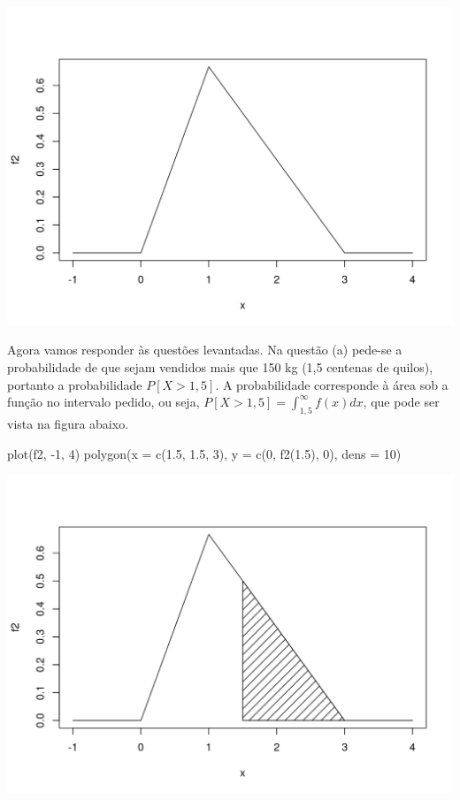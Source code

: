 \documentclass[
  10pt,
  a4paper]{book}
\newenvironment{Shaded}{\begin{snugshade}}{\end{snugshade}}
\newcommand{\AttributeTok}[1]{\textcolor[rgb]{0.77,0.63,0.00}{#1}}
\newcommand{\DecValTok}[1]{\textcolor[rgb]{0.00,0.00,0.81}{#1}}
\newcommand{\FloatTok}[1]{\textcolor[rgb]{0.00,0.00,0.81}{#1}}
\newcommand{\FunctionTok}[1]{\textcolor[rgb]{0.00,0.00,0.00}{#1}}
\newcommand{\NormalTok}[1]{#1}
\newcommand{\SpecialCharTok}[1]{\textcolor[rgb]{0.00,0.00,0.00}{#1}}
\begin{document}
\begin{center}\includegraphics{figures/unnamed-chunk-334-1} \end{center}

Agora vamos responder às questões levantadas. Na questão (a) pede-se a
probabilidade de que sejam vendidos mais que 150 kg (1,5 centenas de
quilos), portanto a probabilidade \(P[X > 1,5]\). A probabilidade
corresponde à área sob a função no intervalo pedido, ou seja,
\(P[X > 1,5] = \int_{1,5}^\infty f(x) dx\), que pode ser vista na figura
abaixo.

\begin{Shaded}
\begin{Highlighting}[]
\FunctionTok{plot}\NormalTok{(f2, }\SpecialCharTok{{-}}\DecValTok{1}\NormalTok{, }\DecValTok{4}\NormalTok{)}
\FunctionTok{polygon}\NormalTok{(}\AttributeTok{x =} \FunctionTok{c}\NormalTok{(}\FloatTok{1.5}\NormalTok{, }\FloatTok{1.5}\NormalTok{, }\DecValTok{3}\NormalTok{), }\AttributeTok{y =} \FunctionTok{c}\NormalTok{(}\DecValTok{0}\NormalTok{, }\FunctionTok{f2}\NormalTok{(}\FloatTok{1.5}\NormalTok{), }\DecValTok{0}\NormalTok{), }\AttributeTok{dens =} \DecValTok{10}\NormalTok{)}
\end{Highlighting}
\end{Shaded}

\begin{center}\includegraphics{figures/unnamed-chunk-335-1} \end{center}
\end{document}
